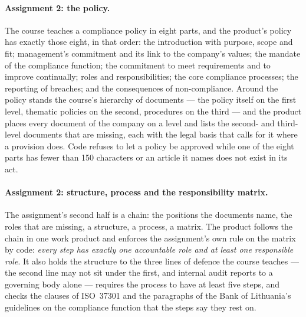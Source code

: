 \paragraph{Assignment 2: the policy.} The course teaches a compliance policy in eight parts,
and the product's policy has exactly those eight, in that order: the introduction with
purpose, scope and fit; management's commitment and its link to the company's values; the
mandate of the compliance function; the commitment to meet requirements and to improve
continually; roles and responsibilities; the core compliance processes; the reporting of
breaches; and the consequences of non-compliance. Around the policy stands the course's
hierarchy of documents --- the policy itself on the first level, thematic policies on the
second, procedures on the third --- and the product places every document of the company on a
level and lists the second- and third-level documents that are missing, each with the legal
basis that calls for it where a provision does. Code refuses to let a policy be approved while
one of the eight parts has fewer than 150 characters or an article it names does not exist in
its act.

\paragraph{Assignment 2: structure, process and the responsibility matrix.} The assignment's
second half is a chain: the positions the documents name, the roles that are missing, a
structure, a process, a matrix. The product follows the chain in one work product and enforces
the assignment's own rule on the matrix by code: \emph{every step has exactly one accountable
role and at least one responsible role}. It also holds the structure to the three lines of
defence the course teaches --- the second line may not sit under the first, and internal audit
reports to a governing body alone --- requires the process to have at least five steps, and
checks the clauses of ISO~37301 and the paragraphs of the Bank of Lithuania's guidelines on the
compliance function that the steps say they rest on.


